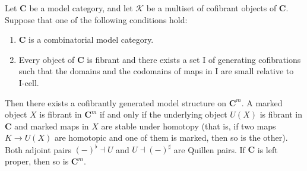 \documentclass[reqno]{amsart}
\theoremstyle{definition}
\theoremstyle{remark}
\newcommand{\cat}[1]{\mathbf{#1}}
\newcommand{\C}{\cat{C}}
\newcommand{\I}{\mathrm{I}}
\newcommand{\class}[2]{#1\text{-}\mathrm{#2}}
\newcommand{\Icell}[1][\I]{\class{#1}{cell}}
\numberwithin{figure}{section}
\begin{document}
\begin{thm}
Let $\C$ be a model category, and let $\mathcal{K}$ be a multiset of cofibrant objects of $\C$.
Suppose that one of the following conditions hold:
\begin{enumerate}
\item \label{it:comb} $\C$ is a combinatorial model category.
\item \label{it:fib} Every object of $\C$ is fibrant and there exists a set $\I$ of generating cofibrations such that
the domains and the codomains of maps in $\I$ are small relative to $\Icell$.
\end{enumerate}
Then there exists a cofibrantly generated model structure on $\C^m$.
A marked object $X$ is fibrant in $\C^m$ if and only if the underlying object $U(X)$ is fibrant in $\C$ and marked maps in $X$ are stable under homotopy
(that is, if two maps $K \to U(X)$ are homotopic and one of them is marked, then so is the other).
Both adjoint pairs $(-)^\flat \dashv U$ and $U \dashv (-)^\sharp$ are Quillen pairs.
If $\C$ is left proper, then so is $\C^m$.
\end{thm}
\end{document}
